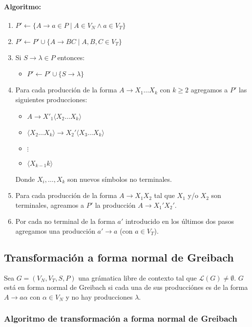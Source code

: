 \paragraph{Algoritmo:}
\begin{enumerate}
  \item \(P'\leftarrow\{ A\to a\in P\mid A\in V_N\land a\in V_T\}\)
  \item \(P'\leftarrow P'\cup\{A\to BC\mid A,B,C\in V_T\}\)
  \item Si \(S\to\lambda\in P\) entonces:
        \begin{itemize}
          \item[] \(P'\leftarrow P'\cup\{S\to\lambda\}\)
        \end{itemize}
  \item Para cada producción de la forma \(A\to X_1\dots X_k\) con \(k\geq 2\) agregamos a \(P'\) las siguientes producciones:
        \begin{itemize}
          \item[] \(A\to X'_1\langle X_2\dots X_k \rangle\)
          \item[] \(\langle X_2\dots X_k\rangle\to X_2'\langle X_3\dots X_k\rangle\)
          \item[] \(\vdots\)
          \item[] \(\langle X_{k-1}{k}\rangle\)
        \end{itemize}
        Donde \(X_i,\dots,X_{k}\) son nuevos símbolos no terminales.
  \item Para cada producción de la forma \(A\to X_1X_2\) tal que \(X_1\) y/o \(X_2\) son terminales, agreamos  a \(P'\) la producción \(A\to X_1'X_2'\).
  \item Por cada no terminal de la forma \(a'\) introducido en los últimos dos pasos agregamos una producción \(a'\to a\) (con \(a\in V_T\)).
\end{enumerate}
\subsection{Transformación a forma normal de Greibach}
Sea \(G = (V_N, V_T, S, P)\) una grámatica libre de contexto tal que \(\mathcal{L}(G)\neq\emptyset\). \(G\)está en forma normal de Greibach si cada una de sus producciónes es de la forma \(A\to a\alpha\) con \(\alpha\in V_N\) y no hay producciones \(\lambda\).

\subsubsection{Algoritmo de transformación a forma normal de Greibach}

